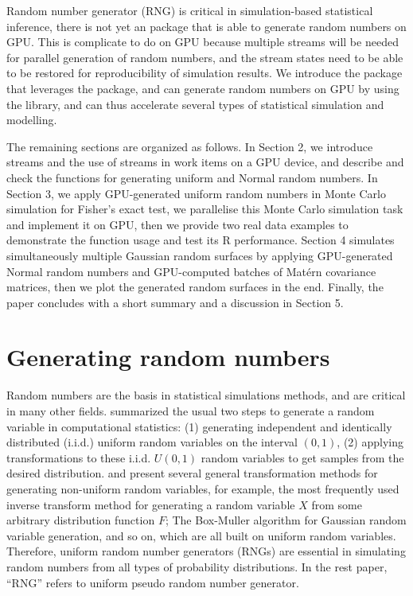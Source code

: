 \documentclass[article,nojss]{jss}\usepackage[]{graphicx}\usepackage[]{color}
\begin{document}
\begin{leftbar}
Random number generator (RNG) is critical in simulation-based statistical inference, there is not yet an  package that is able to generate random numbers on GPU. This is complicate to do on GPU because multiple streams will be needed for parallel generation of random numbers, and the stream states need to be able to be restored for reproducibility of simulation results. We introduce the   package that leverages the  package, and can generate random numbers on GPU by using the  \citep{l2015clrng} library, and can thus accelerate several types of statistical simulation and modelling.

The remaining sections are organized as follows. 
In Section 2, we introduce streams and the use of streams in work items on a GPU device, and describe and check the functions for generating uniform and Normal random numbers.
In Section 3, we apply GPU-generated uniform random numbers in Monte Carlo simulation for Fisher’s exact test, we parallelise this Monte Carlo simulation task and implement it on GPU, then we provide two real data examples to demonstrate the function usage and test its R performance.
Section 4 simulates simultaneously multiple Gaussian random surfaces by applying GPU-generated Normal random numbers and GPU-computed batches of Mat\'ern covariance matrices, then we plot the generated random surfaces in the end. 
Finally, the paper concludes with a short summary and a discussion in Section 5.



\end{leftbar}


\section{Generating random numbers} \label{}
Random numbers are the basis in statistical simulations methods, and are critical in many other fields. \cite{l2012random} summarized the usual two steps to generate a random variable %
in computational statistics: (1) generating independent and identically distributed (i.i.d.) uniform random variables on the interval $(0, 1)$, (2) applying transformations to these i.i.d. $U(0, 1)$ random variables to get samples from the desired distribution. \cite{l2012random} and \cite{robert2004random} present several general transformation methods for generating non-uniform random variables, for example, the most frequently used inverse transform method for generating a random variable $X$ from some arbitrary distribution function $F$; The Box-Muller algorithm \citep{box1958note} for Gaussian random variable generation, and so on, which are all built on uniform random variables. Therefore, uniform random number generators (RNGs) are essential in simulating random numbers from all types of probability distributions. In the rest paper, ``RNG'' refers to uniform pseudo random number generator.
\end{document}
